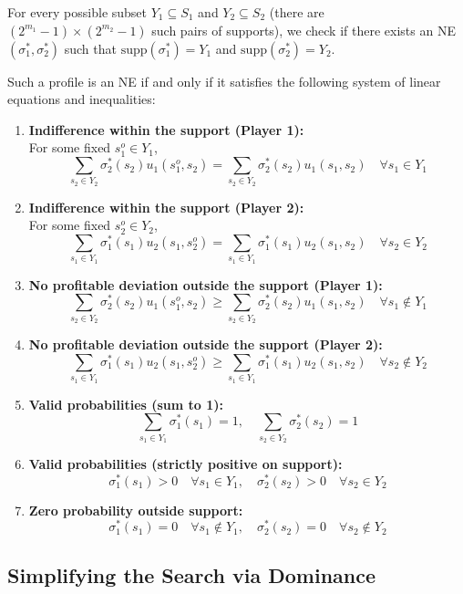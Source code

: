 \documentclass[12pt, a4paper]{article}
\begin{document}
For every possible subset $Y_1 \subseteq S_1$ and $Y_2 \subseteq S_2$ (there are $(2^{m_1}-1) \times (2^{m_2}-1)$ such pairs of supports), we check if there exists an NE $(\sigma_1^*, \sigma_2^*)$ such that $\text{supp}(\sigma_1^*) = Y_1$ and $\text{supp}(\sigma_2^*) = Y_2$.

Such a profile is an NE if and only if it satisfies the following system of linear equations and inequalities:

\begin{enumerate}
    \item \textbf{Indifference within the support (Player 1):} \\
    For some fixed $s_1^o \in Y_1$,
    \[ \sum_{s_2 \in Y_2} \sigma_2^*(s_2) u_1(s_1^o, s_2) = \sum_{s_2 \in Y_2} \sigma_2^*(s_2) u_1(s_1, s_2) \quad \forall s_1 \in Y_1 \]
    \item \textbf{Indifference within the support (Player 2):} \\
    For some fixed $s_2^o \in Y_2$,
    \[ \sum_{s_1 \in Y_1} \sigma_1^*(s_1) u_2(s_1, s_2^o) = \sum_{s_1 \in Y_1} \sigma_1^*(s_1) u_2(s_1, s_2) \quad \forall s_2 \in Y_2 \]
    \item \textbf{No profitable deviation outside the support (Player 1):}
    \[ \sum_{s_2 \in Y_2} \sigma_2^*(s_2) u_1(s_1^o, s_2) \geq \sum_{s_2 \in Y_2} \sigma_2^*(s_2) u_1(s_1, s_2) \quad \forall s_1 \notin Y_1 \]
    \item \textbf{No profitable deviation outside the support (Player 2):}
    \[ \sum_{s_1 \in Y_1} \sigma_1^*(s_1) u_2(s_1, s_2^o) \geq \sum_{s_1 \in Y_1} \sigma_1^*(s_1) u_2(s_1, s_2) \quad \forall s_2 \notin Y_2 \]
    \item \textbf{Valid probabilities (sum to 1):}
    \[ \sum_{s_1 \in Y_1} \sigma_1^*(s_1) = 1, \quad \sum_{s_2 \in Y_2} \sigma_2^*(s_2) = 1 \]
    \item \textbf{Valid probabilities (strictly positive on support):}
    \[ \sigma_1^*(s_1) > 0 \quad \forall s_1 \in Y_1, \quad \sigma_2^*(s_2) > 0 \quad \forall s_2 \in Y_2 \]
    \item \textbf{Zero probability outside support:}
    \[ \sigma_1^*(s_1) = 0 \quad \forall s_1 \notin Y_1, \quad \sigma_2^*(s_2) = 0 \quad \forall s_2 \notin Y_2 \]
\end{enumerate}

\subsection{Simplifying the Search via Dominance}
\end{document}
